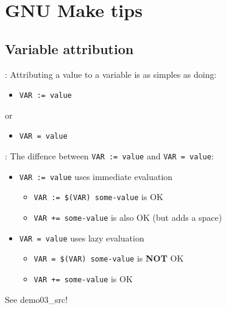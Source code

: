 \section{GNU Make tips}

\subsection{Variable attribution}
\begin{frame}{\secname: \small\subsecname\normalsize}
    Attributing a value to a variable is as simples as doing:

    \begin{itemize}
        \item \texttt{VAR := value}
    \end{itemize}

    or

    \begin{itemize}
        \item \texttt{VAR = value}
    \end{itemize}
\end{frame}

\begin{frame}{\secname: \small\subsecname\normalsize}
    The diffence between \texttt{VAR := value} and \texttt{VAR = value}:

    \begin{itemize}
        \item \texttt{VAR := value} uses immediate evaluation
        \begin{itemize}
            \item \texttt{VAR := \$(VAR) some-value} is OK
            \item \texttt{VAR += some-value} is also OK (but adds a space)
        \end{itemize}
        \item \texttt{VAR = value} uses lazy evaluation
        \begin{itemize}
            \item \texttt{VAR = \$(VAR) some-value} is \textbf{NOT} OK
            \item \texttt{VAR += some-value} is OK
        \end{itemize}
    \end{itemize}

    See demo03\_src!

\end{frame}

